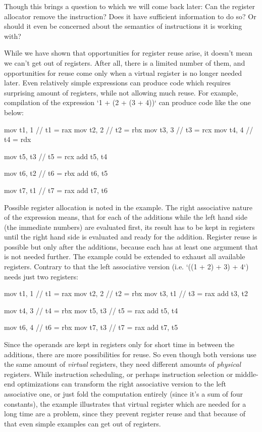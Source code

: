 Though this brings a question to which we will come back later: Can the register
allocator remove the instruction? Does it have sufficient information to do so?
Or should it even be concerned about the semantics of instructions it is working
with?
\enditems

While we have shown that opportunities for register reuse arise, it doesn't mean
we can't get out of registers. After all, there is a limited number of them, and
opportunities for reuse come only when a virtual register is no longer needed
later. Even relatively simple expressions can produce code which requires
surprising amount of registers, while not allowing much reuse. For example,
compilation of the expression `1 + (2 + (3 + 4))` can produce code like the one
below:

\begtt
mov t1, 1  // t1 = rax
mov t2, 2  // t2 = rbx
mov t3, 3  // t3 = rcx
mov t4, 4  // t4 = rdx

mov t5, t3 // t5 = rcx
add t5, t4

mov t6, t2 // t6 = rbx
add t6, t5

mov t7, t1 // t7 = rax
add t7, t6
\endtt

Possible register allocation is noted in the example. The right associative
nature of the expression means, that for each of the additions while the left
hand side (the immediate numbers) are evaluated first, its result has to be kept in
registers until the right hand side is evaluated and ready for the addition.
Register reuse is possible but only after the additions, because each has at
least one argument that is not needed further. The example could be extended to
exhaust all available registers. Contrary to that the left associative version
(i.e. `((1 + 2) + 3) + 4`) needs just two registers:

\begtt
mov t1, 1  // t1 = rax
mov t2, 2  // t2 = rbx
mov t3, t1 // t3 = rax
add t3, t2

mov t4, 3  // t4 = rbx
mov t5, t3 // t5 = rax
add t5, t4

mov t6, 4  // t6 = rbx
mov t7, t3 // t7 = rax
add t7, t5
\endtt

Since the operands are kept in registers only for short time in between the
additions, there are more possibilities for reuse. So even though both versions
use the same amount of {\em virtual} registers, they need different amounts of
{\em physical} registers. While instruction scheduling, or perhaps instruction
selection or middle-end optimizations can transform the right associative
version to the left associative one, or just fold the computation entirely
(since it's a sum of four constants), the example illustrates that virtual
register which are needed for a long time are a problem, since they prevent
register reuse and that because of that even simple examples can get out of
registers.

